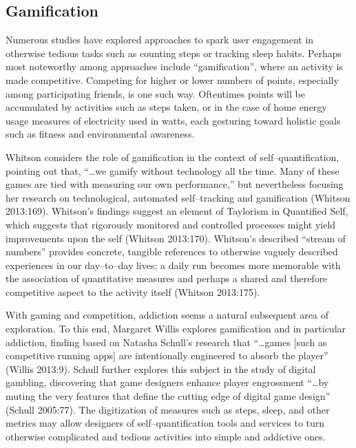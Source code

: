 \documentclass{article}
\begin{document}
\subsection*{Gamification}
Numerous studies have explored approaches to spark user engagement in otherwise tedious tasks such as counting steps or tracking sleep habits.
Perhaps most noteworthy among approaches include ``gamification'',
where an activity is made competitive.
Competing for higher or lower numbers of points,
especially among participating friends,
is one such way.
Oftentimes points will be accumulated by activities such as steps taken,
or in the case of home energy usage measures of electricity used in watts,
each gesturing toward holistic goals such as fitness and environmental awareness.

Whitson considers the role of gamification in the context of self--quantification,
pointing out that,
``\dots we gamify without technology all the time.
Many of these games are tied with measuring our own performance,'' but nevertheless focusing her research on technological,
automated self--tracking and gamification
(Whitson 2013:169).
Whitson's findings suggest an element of Taylorism in Quantified Self,
which suggests that rigorously monitored and controlled processes might yield improvements upon the self
(Whitson 2013:170).
Whitson's described ``stream of numbers'' provides concrete,
tangible references to otherwise vaguely described experiences in our day--to--day lives;
a daily run becomes more memorable with the association of quantitative measures and perhaps a shared and therefore competitive aspect to the activity itself
(Whitson 2013:175).

With gaming and competition,
addiction seems a natural subsequent area of exploration.
To this end,
Margaret Willis explores gamification and in particular addiction,
finding based on Natasha Schull's research that ``\dots games [such as competitive running apps] are intentionally engineered to absorb the player''
(Willis 2013:9).
Schull further explores this subject in the study of digital gambling,
discovering that game designers enhance player engrossment ``\dots by muting the very features that define the cutting edge of digital game design''
(Schull 2005:77).
The digitization of measures such as steps,
sleep,
and other metrics may allow designers of self--quantification tools and services to turn otherwise complicated and tedious activities into simple and addictive ones.
\end{document}
